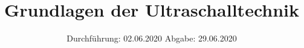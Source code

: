 

\subject{US1}
\title{Grundlagen der Ultraschalltechnik}
\date{%
  Durchführung: 02.06.2020
  \hspace{3em}
  Abgabe: 29.06.2020
}



\maketitle
\thispagestyle{empty}
\tableofcontents
\newpage







\printbibliography{}


